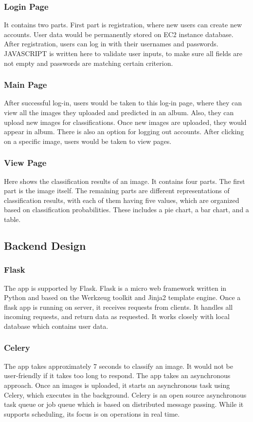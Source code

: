 \documentclass[conference]{IEEEtran}
\begin{document}
\subsubsection{Login Page}
It contains two parts. First part is registration, where new users can create new accounts. User data would be permanently stored on EC2 instance database. After registration, users can log in with their usernames and passwords. JAVASCRIPT is written here to validate user inputs, to make sure all fields are not empty and passwords are matching certain criterion.

\subsubsection{Main Page}
After successful log-in, users would be taken to this log-in page, where they can view all the images they uploaded and predicted in an album. Also, they can upload new images for classifications. Once new images are uploaded, they would appear in album. There is also an option for logging out accounts. After clicking on a specific image, users would be taken to view pages.

\subsubsection{View Page}
Here shows the classification results of an image. It contains four parts. The first part is the image itself. The remaining parts are different representations of classification results, with each of them having five values, which are organized based on classification probabilities. These includes a pie chart, a bar chart, and a table.

\subsection{Backend Design}

\subsubsection{Flask}
The app is supported by Flask. Flask is a micro web framework written in Python and based on the Werkzeug toolkit and Jinja2 template engine.\cite{wiki:flask} Once a flask app is running on server, it receives requests from clients. It handles all incoming requests, and return data as requested. It works closely with local database which contains user data.

\subsubsection{Celery}
The app takes approximately 7 seconds to classify an image. It would not be user-friendly if it takes too long to respond. The app takes an asynchronous approach. Once an images is uploaded, it starts an asynchronous task using Celery, which executes in the background. Celery is an open source asynchronous task queue or job queue which is based on distributed message passing. While it supports scheduling, its focus is on operations in real time.\cite{wiki:flask}
\end{document}
